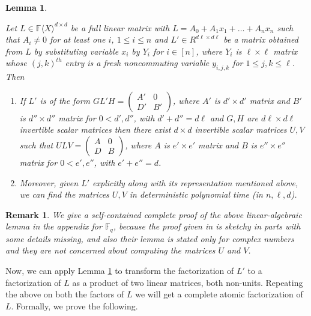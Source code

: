 \documentclass[10pt,a4paper]{article}
\newtheorem{lemma}[theorem]{Lemma}
\newtheorem{remark}[theorem]{Remark}
\newcommand{\F}{\mathbb{F}}
\renewcommand{\angle}[1]{\langle #1 \rangle}
\newcommand{\FX}{\F\angle{X}}
\newcommand{\fR}{\FX}
\begin{document}
\begin{lemma}\cite{HKV20}\label{hkv20-main-lemma}

Let $L \in \fR^{d \times d}$ be a full linear matrix with $L= A_0+ A_1x_1+\ldots +A_n x_n$ such that $A_i \neq 0$ for at least one $i$, $1\leq i \leq n$ and $L'\in
R^{d\ell \times d\ell}$ be a matrix obtained from $L$ by substituting
variable $x_i$ by $Y_i$ for $i \in [n]$, where $Y_i$ is $\ell \times
\ell$ matrix whose $(j,k)^{th}$ entry is a fresh noncommuting variable
$y_{i,j,k}$ for $1 \leq j,k \leq \ell$. Then
\begin{enumerate}
\item If $L'$ is of the form $G L' H = \left(
\begin{array}{c|c}
A' & 0 \\
\hline
D' & B'
\end{array}
\right)$, where $A'$ is $d' \times d'$ matrix and $B'$ is $d'' \times d''$ matrix for $0< d', d''$, with $d'+d''=d\ell$ and $G,H$ are $d\ell \times d\ell$ invertible scalar matrices then there exist $d \times d$ invertible scalar matrices $U, V$ such that  $U L V = \left(
\begin{array}{c|c}
A & 0 \\
\hline
D & B
\end{array}
\right)$, where $A$ is $e' \times e'$ matrix and $B$ is $e'' \times e''$ matrix for $0<e', e''$, with $e' +e''= d$. 

\item Moreover, given $L'$ explicitly along with its representation
  mentioned above, we can find the matrices $U, V$ in deterministic
  polynomial time (in $n,\ell,d$).
\end{enumerate}
\end{lemma}

\begin{remark}
We give a self-contained complete proof of the above linear-algebraic
lemma in the appendix for $\F_q$, because the proof given in
\cite{HKV20} is sketchy in parts with some details missing, and also
their lemma is stated only for complex numbers and they are not
concerned about computing the matrices $U$ and $V$.
\end{remark}

Now, we can apply Lemma \ref{hkv20-main-lemma} to transform the
factorization of $L'$ to a factorization of $L$ as a product of two
linear matrices, both non-units. Repeating the above on both the
factors of $L$ we will get a complete atomic factorization of
$L$. Formally, we prove the following.
\end{document}
